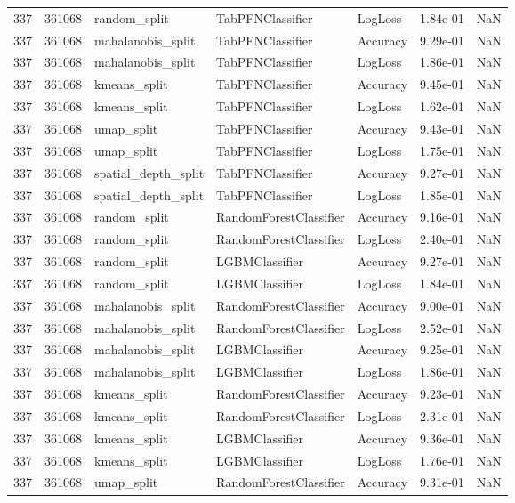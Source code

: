 \begin{tabular}{rrlllrr}
337 & 361068 & random\_split & TabPFNClassifier & LogLoss & 1.84e-01 & NaN \\
337 & 361068 & mahalanobis\_split & TabPFNClassifier & Accuracy & 9.29e-01 & NaN \\
337 & 361068 & mahalanobis\_split & TabPFNClassifier & LogLoss & 1.86e-01 & NaN \\
337 & 361068 & kmeans\_split & TabPFNClassifier & Accuracy & 9.45e-01 & NaN \\
337 & 361068 & kmeans\_split & TabPFNClassifier & LogLoss & 1.62e-01 & NaN \\
337 & 361068 & umap\_split & TabPFNClassifier & Accuracy & 9.43e-01 & NaN \\
337 & 361068 & umap\_split & TabPFNClassifier & LogLoss & 1.75e-01 & NaN \\
337 & 361068 & spatial\_depth\_split & TabPFNClassifier & Accuracy & 9.27e-01 & NaN \\
337 & 361068 & spatial\_depth\_split & TabPFNClassifier & LogLoss & 1.85e-01 & NaN \\
337 & 361068 & random\_split & RandomForestClassifier & Accuracy & 9.16e-01 & NaN \\
337 & 361068 & random\_split & RandomForestClassifier & LogLoss & 2.40e-01 & NaN \\
337 & 361068 & random\_split & LGBMClassifier & Accuracy & 9.27e-01 & NaN \\
337 & 361068 & random\_split & LGBMClassifier & LogLoss & 1.84e-01 & NaN \\
337 & 361068 & mahalanobis\_split & RandomForestClassifier & Accuracy & 9.00e-01 & NaN \\
337 & 361068 & mahalanobis\_split & RandomForestClassifier & LogLoss & 2.52e-01 & NaN \\
337 & 361068 & mahalanobis\_split & LGBMClassifier & Accuracy & 9.25e-01 & NaN \\
337 & 361068 & mahalanobis\_split & LGBMClassifier & LogLoss & 1.86e-01 & NaN \\
337 & 361068 & kmeans\_split & RandomForestClassifier & Accuracy & 9.23e-01 & NaN \\
337 & 361068 & kmeans\_split & RandomForestClassifier & LogLoss & 2.31e-01 & NaN \\
337 & 361068 & kmeans\_split & LGBMClassifier & Accuracy & 9.36e-01 & NaN \\
337 & 361068 & kmeans\_split & LGBMClassifier & LogLoss & 1.76e-01 & NaN \\
337 & 361068 & umap\_split & RandomForestClassifier & Accuracy & 9.31e-01 & NaN \\

\end{tabular}
